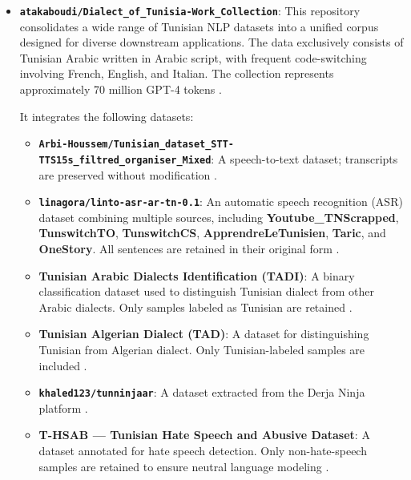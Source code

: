 \documentclass[12pt,a4paper]{report}
\begin{document}
\begin{itemize}

    \item \textbf{\texttt{atakaboudi/Dialect\_of\_Tunisia-Work\_Collection}}:
    This repository consolidates a wide range of Tunisian NLP datasets into a
    unified corpus designed for diverse downstream applications. The data
    exclusively consists of Tunisian Arabic written in Arabic script, with
    frequent code-switching involving French, English, and Italian. The
    collection represents approximately 70 million GPT-4 tokens
    \citep{abdallah2023leveraging}.

    It integrates the following datasets:

    \begin{itemize}

        \item \textbf{\texttt{Arbi-Houssem/Tunisian\_dataset\_STT-TTS15s\_filtred\_organiser\_Mixed}}:
        A speech-to-text dataset; transcripts are preserved without modification
        \citep{arbi_houssem_stt_tts}.

        \item \textbf{\texttt{linagora/linto-asr-ar-tn-0.1}}:
        An automatic speech recognition (ASR) dataset combining multiple sources,
        including \textbf{Youtube\_TNScrapped}, \textbf{TunswitchTO},
        \textbf{TunswitchCS}, \textbf{ApprendreLeTunisien}, \textbf{Taric}, and
        \textbf{OneStory}. All sentences are retained in their original form
        \citep{linagora2024Linto-tn,linagora2024linto_asr}.

        \item \textbf{Tunisian Arabic Dialects Identification (TADI)}:
        A binary classification dataset used to distinguish Tunisian dialect from
        other Arabic dialects. Only samples labeled as Tunisian are retained
        \citep{tadi}.

        \item \textbf{Tunisian Algerian Dialect (TAD)}:
        A dataset for distinguishing Tunisian from Algerian dialect. Only
        Tunisian-labeled samples are included \citep{tunbert_tad}.

        \item \textbf{\texttt{khaled123/tunninjaar}}:
        A dataset extracted from the Derja Ninja platform
        \citep{tunninjaar}.

        \item \textbf{T-HSAB — Tunisian Hate Speech and Abusive Dataset}:
        A dataset annotated for hate speech detection. Only non-hate-speech
        samples are retained to ensure neutral language modeling
        \citep{mulki2019tsab}.


\end{itemize}
\end{itemize}
\end{document}
